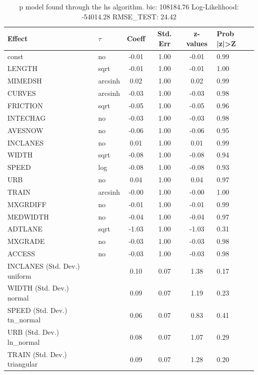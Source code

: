 \begin{table}
	\caption{p model found through the hs algorithm. bic: 108184.76 Log-Likelihood: -54014.28 RMSE_TEST: 24.42}
	\begin{center}
		\begin{tabular}{|l|l|c|c|c|l|}
			\hline
			Effect & $\tau$ & Coeff & Std. Err & z-values & Prob |z|>Z \\
			\hline
			const & no & -0.01 & 1.00 & -0.01 & 0.99 \\
			\hline
			LENGTH & sqrt & -0.01 & 1.00 & -0.01 & 1.00 \\
			\hline
			MIMEDSH & arcsinh & 0.02 & 1.00 & 0.02 & 0.99 \\
			\hline
			CURVES & arcsinh & -0.03 & 1.00 & -0.03 & 0.98 \\
			\hline
			FRICTION & sqrt & -0.05 & 1.00 & -0.05 & 0.96 \\
			\hline
			INTECHAG & no & -0.03 & 1.00 & -0.03 & 0.98 \\
			\hline
			AVESNOW & no & -0.06 & 1.00 & -0.06 & 0.95 \\
			\hline
			INCLANES & no & 0.01 & 1.00 & 0.01 & 0.99 \\
			\hline
			WIDTH & sqrt & -0.08 & 1.00 & -0.08 & 0.94 \\
			\hline
			SPEED & log & -0.08 & 1.00 & -0.08 & 0.93 \\
			\hline
			URB & no & 0.04 & 1.00 & 0.04 & 0.97 \\
			\hline
			TRAIN & arcsinh & -0.00 & 1.00 & -0.00 & 1.00 \\
			\hline
			MXGRDIFF & no & -0.01 & 1.00 & -0.01 & 0.99 \\
			\hline
			MEDWIDTH & no & -0.04 & 1.00 & -0.04 & 0.97 \\
			\hline
			ADTLANE & sqrt & -1.03 & 1.00 & -1.03 & 0.31 \\
			\hline
			MXGRADE & no & -0.03 & 1.00 & -0.03 & 0.98 \\
			\hline
			ACCESS & no & -0.03 & 1.00 & -0.03 & 0.98 \\
			\hline
			INCLANES (Std. Dev.) uniform &  & 0.10 & 0.07 & 1.38 & 0.17 \\
			\hline
			WIDTH (Std. Dev.) normal &  & 0.09 & 0.07 & 1.19 & 0.23 \\
			\hline
			SPEED (Std. Dev.) tn_normal &  & 0.06 & 0.07 & 0.83 & 0.41 \\
			\hline
			URB (Std. Dev.) ln_normal &  & 0.08 & 0.07 & 1.07 & 0.29 \\
			\hline
			TRAIN (Std. Dev.) triangular &  & 0.09 & 0.07 & 1.28 & 0.20 \\

\end{tabular}
\end{center}
\end{table}
